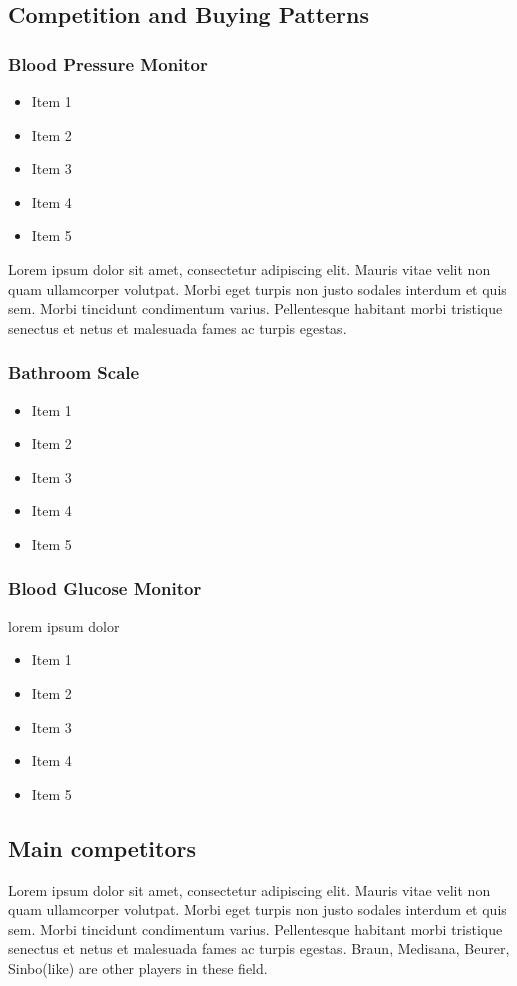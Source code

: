 \documentclass[11pt,titlepage]{article}
\begin{document}
\subsection{Competition and Buying Patterns}

\subsubsection{Blood Pressure Monitor}
\begin{itemize}
\item Item 1
\item Item 2
\item Item 3
\item Item 4
\item Item 5
\end{itemize}
Lorem ipsum dolor sit amet, consectetur adipiscing elit. Mauris vitae velit 
non quam ullamcorper volutpat. Morbi eget turpis non justo sodales interdum 
et quis sem. Morbi tincidunt condimentum varius. Pellentesque habitant morbi 
tristique senectus et netus et malesuada fames ac turpis egestas.\newline
\subsubsection{Bathroom Scale}
\begin{itemize}
\item Item 1
\item Item 2
\item Item 3
\item Item 4
\item Item 5
\end{itemize}
\subsubsection{Blood Glucose Monitor}
lorem ipsum dolor
\begin{itemize}
\item Item 1
\item Item 2
\item Item 3
\item Item 4
\item Item 5
\end{itemize}
\subsection{Main competitors}
Lorem ipsum dolor sit amet, consectetur adipiscing elit. Mauris vitae velit 
non quam ullamcorper volutpat. Morbi eget turpis non justo sodales interdum 
et quis sem. Morbi tincidunt condimentum varius. Pellentesque habitant morbi 
tristique senectus et netus et malesuada fames ac turpis egestas.\newline
Braun, Medisana, Beurer, Sinbo(like) are other players in these field.
\end{document}
